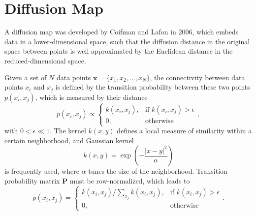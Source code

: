 \section{Diffusion Map\label{Sec:DR:DM}}
A diffusion map was developed by Coifman and Lafon in 2006\cite{CoifmanACHA2006}, which embeds data in a lower-dimensional space, such that the diffusion distance in the original space between points is well approximated by the Euclidean distance in the reduced-dimensional space.

Given a set of $N$ data points $\mathbf{x}=\{x_1, x_2,\dots,x_N\}$, the connectivity between data points $x_i$ and $x_j$ is defined by the transition probability between these two points $p(x_i,x_j)$, which is measured by their distance
\begin{equation}
	p(x_i,x_j)\propto \begin{cases}
		k(x_i,x_j), & \text{if } k(x_i,x_j) >\epsilon\\
		0, & \text{otherwise}
	\end{cases},
\end{equation}
with $0<\epsilon \ll 1$. The kernel $k(x,y)$ defines a local measure of similarity within a certain neighborhood, and Gaussian kernel
\begin{equation}
	k(x,y)=\exp{\left(-\frac{|x-y|^2}{\alpha}\right)}
\end{equation}
is frequently used, where $\alpha$ tunes the size of the neighborhood. Transition probability matrix $\mathbf{P}$ must be row-normalized, which leads to
\begin{equation}
	p(x_i,x_j)= \begin{cases}
		k(x_i,x_j)/\sum\limits_{x_j}k(x_i,x_j), & \text{if } k(x_i,x_j) >\epsilon\\
		0, & \text{otherwise}
	\end{cases}.
\end{equation}
 
